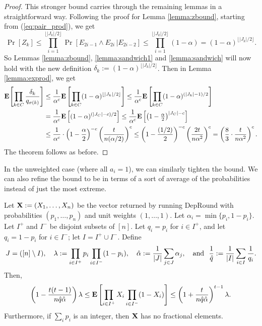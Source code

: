 \begin{proof}
This stronger bound carries through the remaining lemmas in a straightforward way. Following the proof for Lemma \ref{lemma:zbound}, starting from (\ref{eq:pair_prod}), we get
$$\Pr[Z_k]
\le\prod_{i=1}^{\lfloor |J_k|/2\rfloor}\Pr\left[ E_{2i-1}\land E_{2i}\,\Big\vert E_{2i-2}\right]
\le \prod_{i=1}^{\lfloor |J_k|/2\rfloor} (1-\alpha)=(1-\alpha)^{\lfloor |J_k|/2\rfloor}.
$$
So Lemmas \ref{lemma:zbound}, \ref{lemma:sandwich1} and \ref{lemma:sandwich} will now hold with the new definition $\delta_k:=(1-\alpha)^{\lfloor |J_k|/2\rfloor}$. Then in Lemma \ref{lemma:exprod}, we get
\begin{align*} 
\text{\bf E}\hspace{-1pt}\left[ \prod_{k\in C} \frac{\delta_k}{q_{\sigma(k)}} \right] 
&\le\frac{1}{\alpha^c} \text{\bf E}\left[ \prod_{k\in C} (1-\alpha)^{\lfloor |J_k|/2\rfloor}\right] 
\le \frac{1}{\alpha^c}\text{\bf E}\left[ \prod_{k\in C} (1-\alpha)^{(|J_k|-1)/2}\right] 
\\&= \frac{1}{\alpha^c}\text{\bf E}\left[(1-\alpha)^{(|J_C|-c)/2}\right]
\le \frac{1}{\alpha^c}\text{\bf E}\left[\left(1-{\textstyle\frac{\alpha}{2}}\right)^{|J_C|-c}\right]
\\&\le \frac{1}{\alpha^c}\cdot \left(1-\frac{\alpha}{2}\right)^{-c}\left(\frac{t}{n(\alpha/2)}\right)^c
\le \left(1-\frac{(1/2)}{2}\right)^{-c} \left(\frac{2t}{n\alpha^2}\right)^c
=\left(\frac{8}{3}\cdot\frac{t}{n\alpha^2}\right)^c . \label{step:lemma-exjc}
\end{align*}
The theorem follows as before.
\end{proof}

In the unweighted case (where all $a_i=1$), we can similarly tighten the bound. We can also refine the bound to be in terms of a sort of average of the probabilities instead of just the most extreme. 
\begin{theorem}
\label{thm:limited-dep-unweighted}
Let $\mathbf{X}:=(X_1,\ldots,X_n)$ be the vector returned by running {\sc DepRound} with probabilities $(p_1,\ldots,p_n)$ and unit weights $(1,\ldots,1)$. Let $\alpha_i=\min\{p_i,1-p_i\}$. Let $I^+$ and $I^-$ be disjoint subsets of $[n]$.  Let $q_i=p_i$ for $i\in I^+$, and let $q_i=1-p_i$ for $i\in I^-$; let
$I = I^+ \cup I^-$. Define
\[
J = ([n] \setminus I), ~~~\lambda:=\displaystyle\prod_{i\in I^+}p_i\prod_{i\in I^-}(1-p_i), ~~~
\hat{\alpha}:=\frac{1}{|J|}\sum_{j\in J}\alpha_j, ~~~
\text{and}~~ \frac1{\hat{q}}:=\frac{1}{|I|}\sum_{i\in I} \frac{1}{q_i}
.\] 
Then,
\[ \left(1-\frac{t(t-1)}{n\hat{q}\hat{\alpha}}\right) \lambda
\le \text{\bf E}\left[\prod_{i\in I^+} X_i \prod_{i \in I^-}(1-X_i) \right]
\le\left(1+\frac{t}{n\hat{q}\hat{\alpha}}\right)^{t-1} \lambda  .\]
Furthermore, if $\sum_i p_i$ is an integer, then $\mathbf{X}$ has no fractional elements.
\end{theorem}

